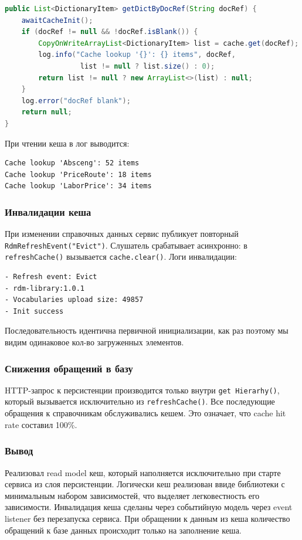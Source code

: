 \begin{lstlisting}[language=Java]
public List<DictionaryItem> getDictByDocRef(String docRef) {
    awaitCacheInit();
    if (docRef != null && !docRef.isBlank()) {
        CopyOnWriteArrayList<DictionaryItem> list = cache.get(docRef);
        log.info("Cache lookup '{}': {} items", docRef,
                  list != null ? list.size() : 0);
        return list != null ? new ArrayList<>(list) : null;
    }
    log.error("docRef blank");
    return null;
}
\end{lstlisting}

При чтении кеша в лог выводится:

\begin{lstlisting}[language={}]
Cache lookup 'Absceng': 52 items
Cache lookup 'PriceRoute': 18 items
Cache lookup 'LaborPrice': 34 items
\end{lstlisting}

\subsubsection{Инвалидации кеша}
При изменении справочных данных сервис публикует повторный
\texttt{RdmRefreshEvent("Evict")}. Слушатель срабатывает асинхронно:
в \texttt{refreshCache()} вызывается \texttt{cache.clear()}. Логи инвалидации:

\begin{lstlisting}[language={}]
- Refresh event: Evict
- rdm-library:1.0.1
- Vocabularies upload size: 49857
- Init success
\end{lstlisting}

Последовательность идентична первичной инициализации, как раз поэтому мы видим одинаковое кол-во загруженных элементов.
\subsubsection{Снижения обращений в базу}
HTTP-запрос к персистенции производится только внутри
\texttt{get Hierarhy()}, который вызывается
исключительно из \texttt{refreshCache()}.
Все последующие обращения к справочникам обслуживались кешем.
Это означает, что cache hit rate составил 100\%.

\subsubsection{Вывод}
Реализовал read model кеш, который наполняется исключительно при старте сервиса из слоя персистенции.
Логически кеш реализован ввиде библиотеки с минимальным набором зависимостей, что выделяет легковестность его зависимости. 
Инвалидация кеша сделаны через событийную модель через event listener без перезапуска сервиса. 
При обращении к данным из кеша количество обращений к базе данных происходит только на заполнение кеша.
